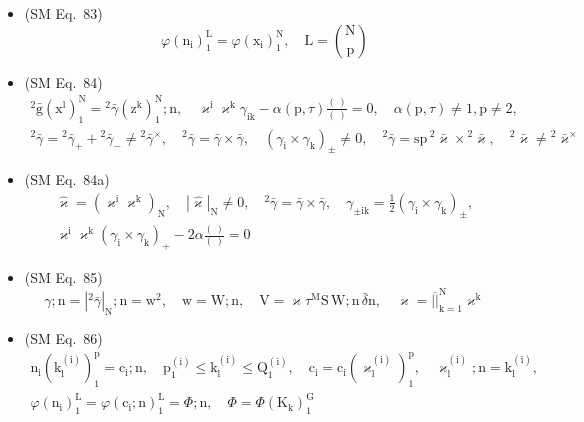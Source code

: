 \documentclass[
    12pt,              %
    a4paper,           %
    headings=normal,   %
    twoside=true,      %
    BCOR=8mm,          %
]{scrbook}
\begin{document}
\begin{itemize}[label={},leftmargin=0pt]
    \item (SM Eq.\ 83) 
    \[
    \varphi(\mathrm{n_i})_1^\mathrm{L} = \varphi(\mathrm{x_i})_1^\mathrm{N}, \quad \mathrm{L} = \binom{\mathrm{N}}{\mathrm{p}}
    \]

    \item (SM Eq.\ 84) 
    \[
    \begin{gathered}
    {}^2\bar{\mathrm{g}}\left( \mathrm{x^l} \right)_1^\mathrm{N} = {}^2\bar{\gamma}\left( \mathrm{z^k} \right)_1^\mathrm{N};\mathrm{n}, \quad \varkappa^\mathrm{i} \varkappa^\mathrm{k} \gamma_{\mathrm{ik}} - \alpha(\mathrm{p}, \tau)\frac{(\ )}{(\ )} = 0, \quad \alpha(\mathrm{p}, \tau) \ne 1, \mathrm{p} \ne 2, \\
    {}^2\bar{\gamma} = {}^2\bar{\gamma}_+ + {}^2\bar{\gamma}_- \ne {}^2\bar{\gamma}^\times, \quad {}^2\bar{\gamma} = \bar{\gamma} \times \bar{\gamma}, \quad (\gamma_\mathrm{i} \times \gamma_\mathrm{k})_\pm \ne 0, \quad {}^2\bar{\gamma} = \mathrm{sp}\,{}^2\bar{\varkappa} \times {}^2\bar{\varkappa}, \quad {}^2\bar{\varkappa} \ne {}^2\bar{\varkappa}^\times
    \end{gathered}
    \]

    \item (SM Eq.\ 84a) 
    \[
    \begin{gathered}
    \hat{\varkappa} = \left( \varkappa^\mathrm{i} \varkappa^\mathrm{k} \right)_\mathrm{N}, \quad \left|\hat{\varkappa}\right|_\mathrm{N} \ne 0, \quad {}^2\bar{\gamma} = \bar{\gamma} \times \bar{\gamma}, \quad \gamma_{\pm \mathrm{ik}} = \frac{1}{2} \left(\gamma_\mathrm{i} \times \gamma_\mathrm{k}\right)_\pm, \\
    \varkappa^\mathrm{i} \varkappa^\mathrm{k} \left(\gamma_\mathrm{i} \times \gamma_\mathrm{k}\right)_+ - 2\alpha \frac{(\ )}{(\ )} = 0
    \end{gathered}
    \]

    \item (SM Eq.\ 85) 
    \[
    \gamma;\mathrm{n} = \left|{}^2\bar{\gamma}\right|_\mathrm{N};\mathrm{n} = \mathrm{w}^2, \quad \mathrm{w} = \mathrm{W};\mathrm{n}, \quad \mathrm{V} = \varkappa \tau^\mathrm{M} \mathrm{S}\,\mathrm{W};\mathrm{n}\,\bar{\delta}\mathrm{n}, \quad \varkappa = \overline{||}_{\mathrm{k}=1}^\mathrm{N} \varkappa^\mathrm{k}
    \]

    \item (SM Eq.\ 86) 
    \[
    \begin{gathered}
    \mathrm{n_i} \left( \mathrm{k_l^{(i)}} \right)_1^\mathrm{p} = \mathrm{c_i};\mathrm{n}, \quad \mathrm{p_1^{(i)}} \le \mathrm{k_l^{(i)}} \le \mathrm{Q_1^{(i)}}, \quad \mathrm{c_i} = \mathrm{c_i} \left( \varkappa_\mathrm{l}^{\mathrm{(i)}} \right)_1^\mathrm{p}, \quad \varkappa_\mathrm{l}^{\mathrm{(i)}};\mathrm{n} = \mathrm{k_l^{(i)}}, \\
    \varphi(\mathrm{n_i})_1^\mathrm{L} = \varphi(\mathrm{c_i};\mathrm{n})_1^\mathrm{L} = \Phi;\mathrm{n}, \quad \Phi = \Phi(\mathrm{K_k})_1^\mathrm{G}
    \end{gathered}
    \]


\end{itemize}
\end{document}
